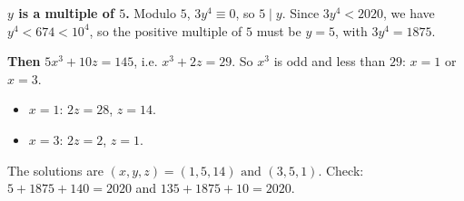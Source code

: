 \textbf{$y$ is a multiple of $5$.} Modulo $5$, $3y^4\equiv0$, so $5\mid y$. Since $3y^4<2020$, we have $y^4<674<10^4$, so the positive multiple of $5$ must be $y=5$, with $3y^4=1875$.

\textbf{Then} $5x^3+10z=145$, i.e. $x^3+2z=29$. So $x^3$ is odd and less than $29$: $x=1$ or $x=3$.
\begin{itemize}
\item $x=1$: $2z=28$, $z=14$.
\item $x=3$: $2z=2$, $z=1$.
\end{itemize}
The solutions are $\boxed{(x,y,z)=(1,5,14)\text{ and }(3,5,1)}$. Check: $5+1875+140=2020$ and $135+1875+10=2020$.
